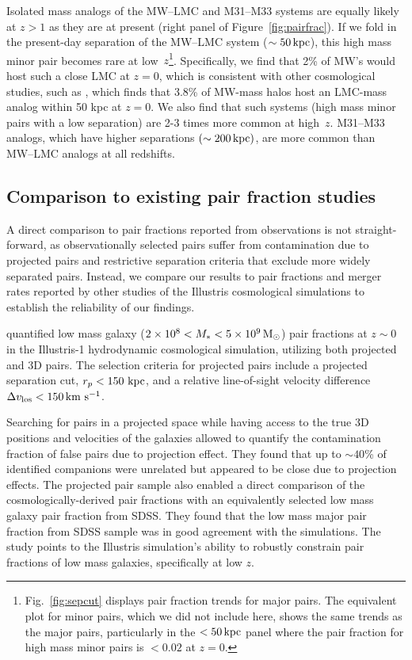 \documentclass[twocolumn]{aastex631}
\begin{document}
    Isolated mass analogs of the MW--LMC and M31--M33 systems are equally likely at $z>1$ as they are at present (right panel of Figure~\ref{fig:pairfrac}). 
    If we fold in the present-day separation of the MW--LMC system ($\sim50 \mathrm{\,kpc}$), this high mass minor pair becomes rare at low~$z$\footnote{Fig.~\ref{fig:sepcut} displays pair fraction trends for major pairs. The equivalent plot for minor pairs, which we did not include here, shows the same trends as the major pairs, particularly in the $<50\mathrm{\,kpc}$ panel where the pair fraction for high mass minor pairs is $<0.02$ at $z=0$.}. Specifically, we find that 2\% of MW's would host such a close LMC at $z=0$, which is consistent with other cosmological studies, such as \citet{Patel2017a-Orbits}, which finds that 3.8\% of MW-mass halos host an LMC-mass analog within 50 kpc at $z=0$. 
    We also find that such systems (high mass minor pairs with a low separation) are 2-3 times more common at high~$z$. M31--M33 analogs, which have higher separations $(\sim200\mathrm{\,kpc})$, are more common than MW--LMC analogs at all redshifts.  


    
\subsection{Comparison to existing pair fraction studies}\label{sec:disc-comp}
    A direct comparison to pair fractions reported from observations is not straight-forward, as observationally selected pairs suffer from contamination due to projected pairs and restrictive separation criteria that exclude more widely separated pairs.
    Instead, we compare our results to pair fractions and merger rates reported by other studies of the Illustris cosmological simulations to establish the reliability of our findings. 

        \citet{Besla2018} quantified low mass galaxy ($2\times10^{8} < M_{*} < 5\times10^{9}\,\mathrm{M}_\odot$) pair fractions at $z\sim0$ in the Illustris-1 hydrodynamic cosmological simulation, utilizing both projected and 3D pairs.
        The selection criteria for projected pairs include a projected separation cut, $r_{p} < 150\,\mathrm{\,kpc}$, and a relative line-of-sight velocity difference $\Delta v_{\rm los} < 150\,\mathrm{km}~\mathrm{s}^{-1}$.
        
        Searching for pairs in a projected space while having access to the true 3D positions and velocities of the galaxies allowed \cite{Besla2018} to quantify the contamination fraction of false pairs due to projection effect. 
        They found that up to $\sim40$\% of identified companions were unrelated but appeared to be close due to projection effects. 
        The projected pair sample also enabled a direct comparison of the cosmologically-derived pair fractions with an equivalently selected low mass galaxy pair fraction from SDSS.
        They found that the low mass major pair fraction from SDSS sample was in good agreement with the simulations. The~\citet{Besla2018} study points to the Illustris simulation's ability to robustly constrain pair fractions of low mass galaxies, specifically at low $z$.
\end{document}
